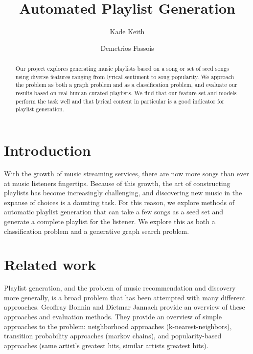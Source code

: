 \documentclass[acmtog]{acmart}
\begin{document}
\title{Automated Playlist Generation}

\author{Kade Keith}
\author{Demetrios Fassois}

\begin{abstract}
Our project explores generating music playlists based on a song or set of seed songs using diverse features ranging from lyrical sentiment to song popularity. We approach the problem as both a graph problem and as a classification problem, and evaluate our results based on real human-curated playlists. We find that our feature set and models perform the task well and that lyrical content in particular is a good indicator for playlist generation.
\end{abstract}

\maketitle
\thispagestyle{empty}

\section{Introduction}

With the growth of music streaming services, there are now more songs than ever at music listeners fingertips. Because of this growth, the art of constructing playlists has become increasingly challenging, and discovering new music in the expanse of choices is a daunting task. For this reason, we explore methods of automatic playlist generation that can take a few songs as a seed set and generate a complete playlist for the listener. We explore this as both a classification problem and a generative graph search problem.

\section{Related work}

Playlist generation, and the problem of music recommendation and discovery more generally, is a broad problem that has been attempted with many different approaches. Geoffray Bonnin and Dietmar Jannach \cite{Bonnin2013ACO} provide an overview of these approaches and evaluation methods. They provide an overview of simple approaches to the problem: neighborhood approaches (k-nearest-neighbors), transition probability approaches (markov chains), and popularity-based approaches (same artist's greatest hits, similar artists greatest hits).
\end{document}
